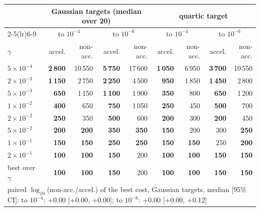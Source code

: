 \begin{tabular}{l rrrrrrrr}
\toprule
 & \multicolumn{4}{c}{Gaussian targets (median over 20)} & \multicolumn{4}{c}{quartic target} \\
\cmidrule(lr){2-5}\cmidrule(lr){6-9}
 & \multicolumn{2}{c}{to $10^{-4}$} & \multicolumn{2}{c}{to $10^{-6}$} & \multicolumn{2}{c}{to $10^{-4}$} & \multicolumn{2}{c}{to $10^{-6}$} \\
$\gamma$ & accel. & non-acc. & accel. & non-acc. & accel. & non-acc. & accel. & non-acc. \\
\midrule
$5\times10^{-4}$ & \textbf{2\,800} & 10\,550 & \textbf{5\,750} & 17\,600 & \textbf{1\,050} & 6\,950 & \textbf{3\,700} & 10\,550 \\
$2\times10^{-3}$ & \textbf{1\,150} & 2\,750 & \textbf{2\,250} & 4\,500 & \textbf{950} & 1\,850 & \textbf{1\,450} & 2\,800 \\
$5\times10^{-3}$ & \textbf{650} & 1\,150 & \textbf{1\,100} & 1\,900 & \textbf{350} & 800 & \textbf{650} & 1\,200 \\
$1\times10^{-2}$ & \textbf{400} & 650 & \textbf{750} & 1\,050 & \textbf{250} & 450 & \textbf{500} & 700 \\
$2\times10^{-2}$ & \textbf{250} & 350 & \textbf{500} & 600 & \textbf{200} & 300 & \textbf{200} & 450 \\
$5\times10^{-2}$ & \textbf{200} & \textbf{200} & \textbf{350} & \textbf{350} & \textbf{150} & 200 & 300 & \textbf{250} \\
$1\times10^{-1}$ & \textbf{150} & \textbf{150} & \textbf{250} & \textbf{250} & \textbf{150} & \textbf{150} & 250 & \textbf{200} \\
$2\times10^{-1}$ & \textbf{100} & \textbf{100} & \textbf{150} & 200 & \textbf{100} & \textbf{100} & \textbf{150} & \textbf{150} \\
\midrule
best over $\gamma$ & \textbf{100} & \textbf{100} & \textbf{150} & 200 & \textbf{100} & \textbf{100} & \textbf{150} & \textbf{150} \\
\multicolumn{9}{l}{\footnotesize paired $\log_{10}$(non-acc./accel.) of the best cost, Gaussian targets, median [95\% CI]: to $10^{-4}$: +0.00 [+0.00, +0.00]; to $10^{-6}$: +0.00 [+0.00, +0.12]} \\
\bottomrule
\end{tabular}
